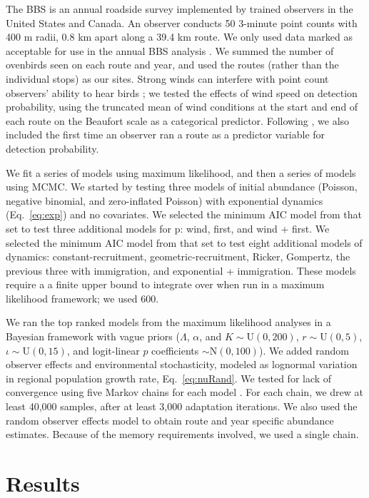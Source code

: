 \documentclass[12pt,english]{article}
\begin{document}
\begin{spacing}{1.9}
\begin{flushleft}
The BBS is an annual roadside survey implemented by trained
observers in the United States and Canada. An observer conducts 50
3-minute point counts with 400 m radii, 0.8 km apart 
along a
39.4 km route. We only used data marked as acceptable for use in the annual BBS
analysis \citep{sauer_etal:1994auk}.  We summed the number of ovenbirds
seen on each route and year, and used the routes (rather
than the individual stops) as our sites.
Strong winds can interfere with point count observers' ability
to hear birds \citep{simons_etal:2007}; we tested the effects of wind
speed on detection probability, using the truncated mean of wind conditions at the start and end of
each route on the Beaufort scale as a categorical predictor. 
Following \citet{link_sauer:2002},
we also included the first time an observer ran a route as a predictor variable for detection
probability.
 
We fit a series of models using maximum likelihood, 
and then a series of models using MCMC. We started by testing
three models of initial abundance (Poisson, negative binomial, and
zero-inflated Poisson) with exponential dynamics
(Eq.~\ref{eq:exp}) and no covariates.  We selected the minimum AIC model from that set to test three additional
models for p: wind, first, and wind + first. We selected the minimum
AIC model from that set to test eight additional models of dynamics:
constant-recruitment, geometric-recruitment, Ricker, Gompertz, 
the previous three with immigration, and exponential + immigration.
These models require a a finite upper bound to integrate
over when run in a maximum likelihood
framework; we used 600. 

We ran the top ranked models from the maximum likelihood
analyses in a Bayesian framework with vague  
priors ($\Lambda$,
$\alpha$, and $K  \sim \mathrm{U}(0, 200)$, $r  \sim \mathrm{U}(0, 5)$,
$\iota  \sim \mathrm{U}(0, 15)$, and logit-linear $p$ coefficients $\sim \mathrm{N}(0, 100)$).  
We added random observer 
effects and environmental stochasticity, modeled as lognormal
variation in regional population growth rate, Eq.~\ref{eq:nuRand}.
We tested for lack of convergence using
five Markov chains for each model \citep{gelman_rubin:1992}.
For each chain, we drew at least 40,000 samples, 
after at least 3,000 adaptation iterations.   
We also used the random observer effects model to obtain route and 
year specific abundance estimates.  Because of the memory requirements involved,
we used a single chain.  

\section*{Results}


\end{flushleft}
\end{spacing}
\end{document}
